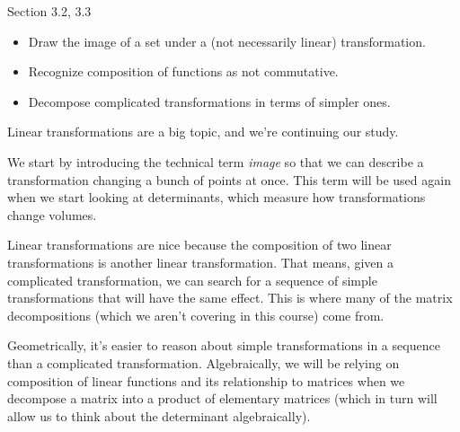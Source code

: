 \begin{lesson}

	Section 3.2, 3.3

	\begin{itemize}
		\item Draw the image of a set under a (not necessarily linear) transformation.
		\item Recognize composition of functions as not commutative.
		\item Decompose complicated transformations in terms of simpler ones.
	\end{itemize}

		Linear transformations are a big topic, and we're continuing our study.

		We start by introducing the technical term \emph{image} so that we can describe
		a transformation changing a bunch of points at once. This term will be used again when
		we start looking at determinants, which measure how transformations change volumes.

		Linear transformations are nice because the composition of two linear transformations
		is another linear transformation. That means, given a complicated transformation, we can
		search for a sequence of simple transformations that will have the same effect. This is
		where many of the matrix decompositions (which we aren't covering in this course) come from.

		Geometrically, it's easier to reason about simple transformations in a sequence than a complicated
		transformation. Algebraically, we will be relying on composition of linear functions and its relationship
		to matrices when we decompose a matrix into a product of elementary matrices (which in turn will
		allow us to think about the determinant algebraically).
\end{lesson}
	\bookonlynewpage

